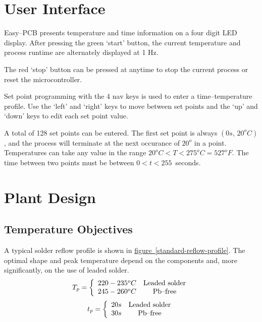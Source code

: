 \documentclass[10pt, twocolumn]{article}
\begin{document}
\tableofcontents

\section{User Interface}

Easy--PCB presents temperature and time information on a four digit LED display.
After pressing the green `start' button, the current temperature and process
runtime are alternately displayed at 1 Hz.

The red `stop' button can be pressed at anytime to stop the current process
or reset the microcontroller.

Set point programming with the 4 nav keys is used to enter a time--temperature profile.
Use the `left' and `right' keys to move between set points and the `up' and `down'
keys to edit each set point value.

A total of 128 set points can be entered. The first set point is always $(0s,\,20^{o}C)$,
and the process will terminate at the next occurance of $20^{o}$ in a point.
Temperatures can take any value in the range \mbox{$20^{o}C<T<275^{o}C=527^{o}F$.}
The time between two points must be between \mbox{$0<t<255$ seconds.}

\section{Plant Design}

\subsection{Temperature Objectives}

A typical solder reflow profile is shown in
\hyperref[standard-reflow-profile]{\mbox{figure \ref{standard-reflow-profile}}}.
The optimal shape and peak temperature depend on the components and,
more significantly, on the use of leaded solder.
\begin{equation*}
T_{p}=\left\{\begin{array}{c c}
220-235^{o}C	&\textrm{Leaded solder}	\\
245-260^{o}C	&\textrm{Pb--free}	\\
\end{array}\right.
\end{equation*}
\begin{equation*}
t_{p}=\left\{\begin{array}{c c}
20s	&\textrm{Leaded solder}	\\
30s	&\textrm{Pb--free}	\\
\end{array}\right.
\end{equation*}
\end{document}

